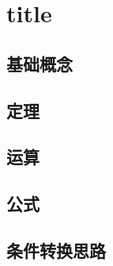 \documentclass[a4paper,12pt]{article}
\begin{document}


    \section{title}

    \subsection{基础概念}

    \begin{enumerate}
    \end{enumerate}

    \subsection{定理}

    \begin{enumerate}
    \end{enumerate}

    \subsection{运算}

    \begin{enumerate}

    \end{enumerate}

    \subsection{公式}

    \subsection{条件转换思路}

    \begin{enumerate}

    \end{enumerate}
\end{document}
